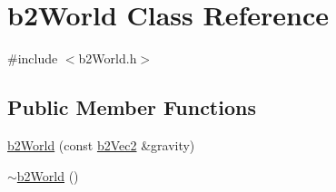 \hypertarget{classb2_world}{\section{b2\-World Class Reference}
\label{classb2_world}
}


{\ttfamily \#include $<$b2\-World.\-h$>$}

\subsection*{Public Member Functions}
\begin{DoxyCompactItemize}
\item 
\hyperlink{classb2_world_aeccc87fd9e36702c821a8244ca7cd875}{b2\-World} (const \hyperlink{structb2_vec2}{b2\-Vec2} \&gravity)
\item 
\hypertarget{classb2_world_a5250ae4487475c33ccefdead07c768c8}{\hyperlink{classb2_world_a5250ae4487475c33ccefdead07c768c8}{$\sim$b2\-World} ()}\label{classb2_world_a5250ae4487475c33ccefdead07c768c8}


\end{DoxyCompactItemize}
